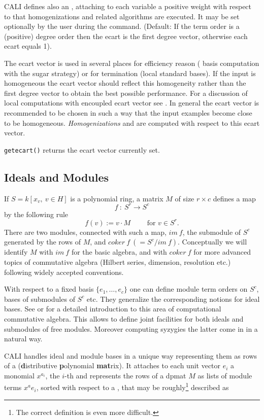 CALI defines also an , attaching to each variable a
positive weight with respect to that homogenizations and related
algorithms are executed. It may be set optionally by the user during
the  command.  (Default: If the term order is a
(positive) degree order then the ecart is the first degree vector,
otherwise each ecart equals 1).

The ecart vector is used in several places for efficiency reason (\gr
basis computation with the sugar strategy) or for termination (local
standard bases). If the input is homogeneous the ecart vector should
reflect this homogeneity rather than the first degree vector to
obtain the best possible performance. For a discussion of local
computations with encoupled ecart vector see \cite{tcah}. In general
the ecart vector is recommended to be chosen in such a way that the
input examples become close to be homogeneous. {\em Homogenizations}
and  are computed with respect to this ecart
vector.
\medskip

\noindent \verb|getecart()| returns the ecart vector
currently set.


\subsection{Ideals and Modules}

If $S=k[x_v,\ v \in H]$ is a polynomial ring, a matrix $M$ of size
$r\times c$ defines a map
\[f\ :\ S^r \longrightarrow S^c\]
by the following rule
\[ f(v):=v\cdot M \qquad \mbox{ for } v \in S^r.\]
There are two modules, connected with such a map, $im\ f$, the
submodule of $S^c$ generated by the rows of $M$, and $coker\ f\
(=S^c/im\ f)$. Conceptually we will identify $M$ with $im\ f$ for the
basic algebra, and with $coker\ f$ for more advanced topics of
commutative algebra (Hilbert series, dimension, resolution etc.)
following widely accepted conventions.

With respect to a fixed basis $\{e_1,\ldots ,e_c\}$ one can define
module term orders on $S^c$, \gr bases of submodules of $S^c$ etc.
They generalize the corresponding notions for ideal bases. See
\cite{E} or \cite{MM} for a detailed introduction to this area of
computational commutative algebra. This allows to define joint
facilities for both ideals and submodules of free modules. Moreover
computing syzygies the latter come in in a natural way.

CALI handles ideal and module bases in a unique way representing them
as rows of a \ind{dpmat} ({\bf d}istributive {\bf p}olynomial {\bf
mat}rix). It attaches to each unit vector $e_i$ a monomial $x^{a_i}$,
the $i$-th \ind{column degree} and represents the rows of a dpmat $M$
as lists of module terms $x^ae_i$, sorted with respect to a
, that may be roughly\footnote{The correct
definition is even more difficult.} described as
\bigskip

